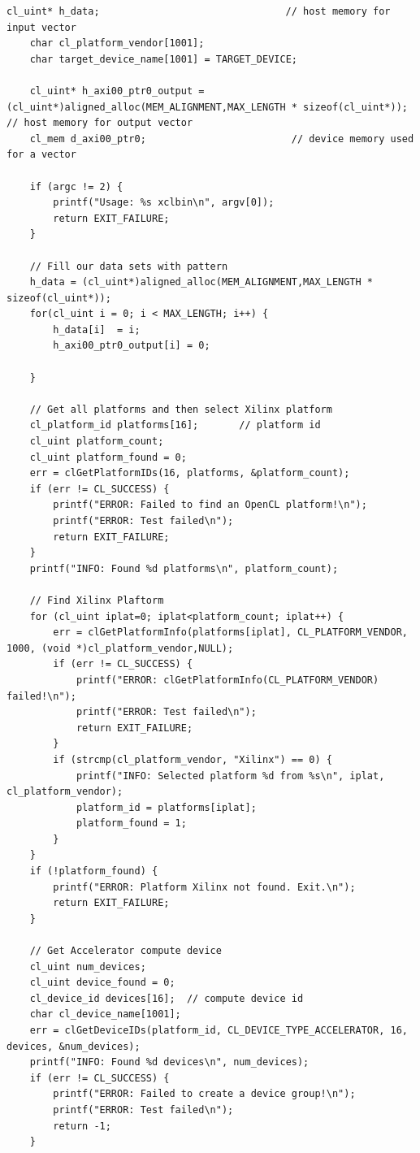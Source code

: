 \begin{lstlisting}[label=code, basicstyle=\tiny, caption=Листинг файла host\_example.cpp]
    cl_uint* h_data;                                // host memory for input vector
    char cl_platform_vendor[1001];
    char target_device_name[1001] = TARGET_DEVICE;

    cl_uint* h_axi00_ptr0_output = (cl_uint*)aligned_alloc(MEM_ALIGNMENT,MAX_LENGTH * sizeof(cl_uint*)); // host memory for output vector
    cl_mem d_axi00_ptr0;                         // device memory used for a vector

    if (argc != 2) {
        printf("Usage: %s xclbin\n", argv[0]);
        return EXIT_FAILURE;
    }

    // Fill our data sets with pattern
    h_data = (cl_uint*)aligned_alloc(MEM_ALIGNMENT,MAX_LENGTH * sizeof(cl_uint*));
    for(cl_uint i = 0; i < MAX_LENGTH; i++) {
        h_data[i]  = i;
        h_axi00_ptr0_output[i] = 0; 

    }

    // Get all platforms and then select Xilinx platform
    cl_platform_id platforms[16];       // platform id
    cl_uint platform_count;
    cl_uint platform_found = 0;
    err = clGetPlatformIDs(16, platforms, &platform_count);
    if (err != CL_SUCCESS) {
        printf("ERROR: Failed to find an OpenCL platform!\n");
        printf("ERROR: Test failed\n");
        return EXIT_FAILURE;
    }
    printf("INFO: Found %d platforms\n", platform_count);

    // Find Xilinx Plaftorm
    for (cl_uint iplat=0; iplat<platform_count; iplat++) {
        err = clGetPlatformInfo(platforms[iplat], CL_PLATFORM_VENDOR, 1000, (void *)cl_platform_vendor,NULL);
        if (err != CL_SUCCESS) {
            printf("ERROR: clGetPlatformInfo(CL_PLATFORM_VENDOR) failed!\n");
            printf("ERROR: Test failed\n");
            return EXIT_FAILURE;
        }
        if (strcmp(cl_platform_vendor, "Xilinx") == 0) {
            printf("INFO: Selected platform %d from %s\n", iplat, cl_platform_vendor);
            platform_id = platforms[iplat];
            platform_found = 1;
        }
    }
    if (!platform_found) {
        printf("ERROR: Platform Xilinx not found. Exit.\n");
        return EXIT_FAILURE;
    }

    // Get Accelerator compute device
    cl_uint num_devices;
    cl_uint device_found = 0;
    cl_device_id devices[16];  // compute device id
    char cl_device_name[1001];
    err = clGetDeviceIDs(platform_id, CL_DEVICE_TYPE_ACCELERATOR, 16, devices, &num_devices);
    printf("INFO: Found %d devices\n", num_devices);
    if (err != CL_SUCCESS) {
        printf("ERROR: Failed to create a device group!\n");
        printf("ERROR: Test failed\n");
        return -1;
    }


\end{lstlisting}
